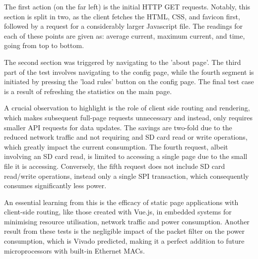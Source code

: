 The first action (on the far left) is the initial HTTP GET requests. Notably, this section is split in two, as the client fetches the HTML, CSS, and favicon first, followed by a request for a considerably larger Javascript file. The readings for each of these points are given as: average current, maximum current, and time, going from top to bottom.

The second section was triggered by navigating to the 'about page'. The third part of the test involves navigating to the config page, while the fourth segment is initiated by pressing the 'load rules' button on the config page. The final test case is a result of refreshing the statistics on the main page.

A crucial observation to highlight is the role of client side routing and rendering, which makes subsequent full-page requests unnecessary and instead, only requires smaller API requests for data updates. The savings are two-fold due to the reduced network traffic and not requiring and SD card read or write operations, which greatly impact the current consumption. The fourth request, albeit involving an SD card read, is limited to accessing a single page due to the small file it is accessing. Conversely, the fifth request does not include SD card read/write operations, instead only a single SPI transaction, which consequently consumes significantly less power.

An essential learning from this is the efficacy of static page applications with client-side routing, like those created with Vue.js, in embedded systems for minimising resource utilisation, network traffic and power consumption. Another result from these tests is the negligible impact of the packet filter on the power consumption, which is Vivado predicted, making it a perfect addition to future microprocessors with built-in Ethernet MACs.
